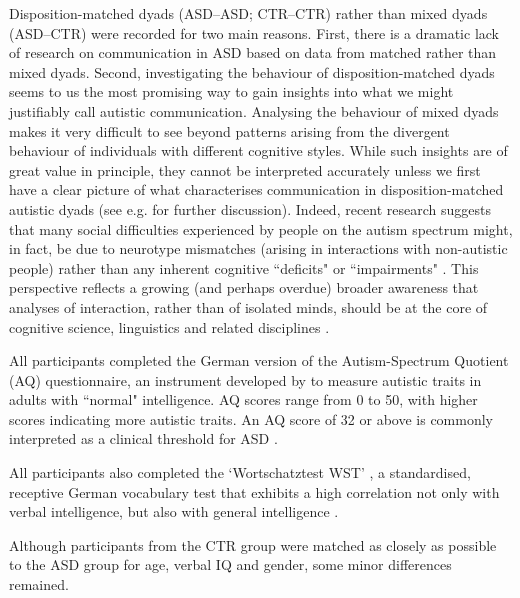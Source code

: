 Disposition-matched dyads (ASD--ASD; CTR--CTR) rather than mixed dyads (ASD--CTR) were recorded for two main reasons. First, there is a dramatic lack of research on communication in ASD based on data from matched rather than mixed dyads. Second, investigating the behaviour of disposition-matched dyads seems to us the most promising way to gain insights into what we might justifiably call autistic communication. Analysing the behaviour of mixed dyads makes it very difficult to see beyond patterns arising from the divergent behaviour of individuals with different cognitive styles. While such insights are of great value in principle, they cannot be interpreted accurately unless we first have a clear picture of what characterises communication in disposition-matched autistic dyads (see e.g.   for further discussion). Indeed, recent research suggests that many social difficulties experienced by people on the autism spectrum might, in fact, be due to neurotype mismatches (arising in interactions with non-autistic people) rather than any inherent cognitive ``deficits" or ``impairments" \citep{cromptonNeurotypeMatchingNotBeing2020, morrisonOutcomesRealworldSocial2020, rifaiInvestigatingMarkersRapport2022}. This perspective reflects a growing (and perhaps overdue) broader awareness that analyses of interaction, rather than of isolated minds, should be at the core of cognitive science, linguistics and related disciplines \citep{dingemanseSingleMindednessFigureGroundReversal2023}.

All participants completed the German version of the Autism-Spectrum Quotient (AQ) questionnaire, an instrument developed by \citet{baron-cohenAutismspectrumQuotientAQ2001} to measure autistic traits in adults with ``normal" intelligence. AQ scores range from 0 to 50, with higher scores indicating more autistic traits. An AQ score of 32 or above is commonly interpreted as a clinical threshold for ASD \citep{ashwoodPredictingDiagnosisAutism2016, baron-cohenAutismspectrumQuotientAQ2001}.

All participants also completed the `Wortschatztest WST'  \citep{schmidtWortschatztestWSTBeltz1992}, a standardised, receptive German vocabulary test that exhibits a high correlation not only with verbal intelligence, but also with general intelligence \citep{satzgerLiefernHAWIERWST2002}.

Although participants from the CTR group were matched as closely as possible to the ASD group for age, verbal IQ and gender, some minor differences remained.


